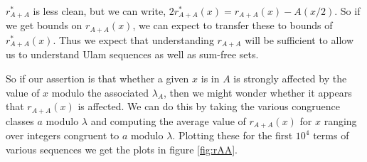 \documentclass{report}
\theoremstyle{remark}
\numberwithin{equation}{section}
\begin{document}
$r^*_{A+A}$ is less clean, but we can write,
$2r^*_{A+A}(x) = r_{A+A}(x) - A(x/2)$.  So if we get bounds on
$r_{A+A}(x)$, we can expect to transfer these to bounds of
$r^*_{A+A}(x)$.  Thus we expect that understanding $r_{A+A}$ will be
sufficient to allow us to understand Ulam sequences as well as
sum-free sets.

So if our assertion is that whether a given $x$ is in $A$ is strongly
affected by the value of $x$ modulo the associated $\lambda_A$, then
we might wonder whether it appears that $r_{A+A}(x)$ is affected.  We
can do this by taking the various congruence classes $a$ modulo
$\lambda$ and computing the average value of $r_{A+A}(x)$ for $x$
ranging over integers congruent to $a$ modulo $\lambda$.  Plotting
these for the first $10^4$ terms of various sequences we get the
plots in figure \ref{fig:rAA}.
\end{document}
